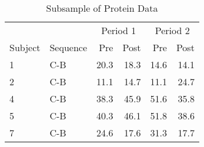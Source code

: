 \begin{table}

\caption{Subsample of Protein Data}
\centering
\begin{tabular}[t]{l>{}l|rrrr}
\toprule
\multicolumn{2}{c}{ } & \multicolumn{2}{c}{Period 1} & \multicolumn{2}{c}{Period 2} \\
\cmidrule(l{3pt}r{3pt}){3-4} \cmidrule(l{3pt}r{3pt}){5-6}
Subject & Sequence & Pre & Post & Pre & Post\\
\midrule
1 & C-B & 20.3 & 18.3 & 14.6 & 14.1\\
2 & C-B & 11.1 & 14.7 & 11.1 & 24.7\\
4 & C-B & 38.3 & 45.9 & 51.6 & 35.8\\
5 & C-B & 40.3 & 46.1 & 51.8 & 38.6\\
7 & C-B & 24.6 & 17.6 & 31.3 & 17.7\\
\bottomrule
\end{tabular}
\end{table}
